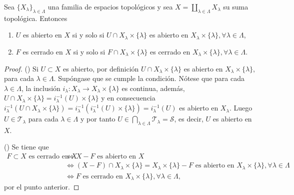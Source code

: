 

\begin{theorem}
Sea $\{ X_{\lambda} \}_{\lambda \in \Lambda}$ una familia de espacios topológicos y sea $X = \coprod_{\lambda \in \Lambda} X_{\lambda}$ su suma topológica. Entonces
\begin{enumerate}[label=\textnormal{(\roman*)}]
\item $U$ es abierto en $X$ si y solo si $U \cap X_{\lambda} \times \{ \lambda \}$ es abierto en $X_{\lambda} \times \{ \lambda \},\forall \lambda \in \Lambda$,
\item $F$ es cerrado en $X$ si y solo si $F \cap X_{\lambda} \times \{ \lambda \}$ es cerrado en $X_{\lambda} \times \{ \lambda \},\forall \lambda \in \Lambda$.
\end{enumerate}
\end{theorem}

\begin{proof}
({\scshape{}}) Si $U \subset X$ es abierto, por definición $U \cap X_{\lambda} \times \{ \lambda \}$ es abierto en $X_{\lambda} \times \{ \lambda \}$, para cada $\lambda \in \Lambda$. Supóngase que se cumple la condición. Nótese que para cada $\lambda \in \Lambda$, la inclusión $i_{\lambda} : X_{\lambda} \longrightarrow X_{\lambda} \times \{ \lambda \}$ es continua, además, $U \cap X_{\lambda} \times \{ \lambda \} = i^{-1}_{\lambda}(U) \times \{ \lambda \}$ y en consecuencia $i^{-1}_{\lambda}(U \cap X_{\lambda }\times \{ \lambda \}) = i^{-1}_{\lambda}(i^{-1}_{\lambda}(U) \times \{ \lambda \}) = i^{-1}_{\lambda}(U)$ es abierto en $X_{\lambda}$. Luego $U \in \mathcal{T}_{\lambda}$ para cada $\lambda \in \Lambda$ y por tanto $U \in \bigcap_{\lambda \in \Lambda} \mathcal{T}_{\lambda} = \mathcal{S}$, es decir, $U$ es abierto en $X$.
\bigskip

({\scshape{}}) Se tiene que
\begin{align*}
    F \subset X \text{ es cerrado en } X & \iff X - F \text{ es abierto en } X \\
                                           & \iff (X - F) \cap X_{\lambda} \times \{ \lambda \} = X_{\lambda} \times \{ \lambda \} - F \text{ es abierto en } X_{\lambda} \times \{ \lambda \}, \forall \lambda \in \Lambda \\
                                           & \iff F \text{ es cerrado en } X_{\lambda} \times \{ \lambda \}, \forall \lambda \in \Lambda,
\end{align*}
por el punto anterior.
\end{proof}
